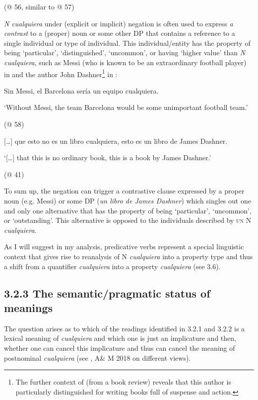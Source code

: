   (@ 56, similar to @ 57)

\textit{N cualquiera} under (explicit or implicit) negation is often used to express \textit{a contrast}\textbf{ }to a (proper) noun or some other DP that contains a reference to a single individual or type of individual. This individual/entity has the property of being ‘particular’, ‘distinguished’, ‘uncommon’, or having ‘higher value’ than \textit{N cualquiera}, such as Messi (who is known to be an extraordinary football player) in  and the author John Dashner\footnote{The further context of  (from a book review) reveals that this author is particularly distinguished for writing books full of suspense and action.} in :

\label{bkm:Ref66615171}  Sin Messi, el Barcelona sería un equipo cualquiera.

  ‘Without Messi, the team Barcelona would be some unimportant football team.’

  (@ 58)

\label{bkm:Ref150779604}  […] que esto no es un libro cualquiera, esto es un libro de James Dashner.

  ‘[…] that this is no ordinary book, this is a book by James Dashner.’

  (@ 41)

To sum up, the negation can trigger a contrastive clause expressed by a proper noun (e.g. Messi) or some DP (\textit{un libro de James Dashner}) which singles out one and only one alternative that has the property of being ‘particular’, ‘uncommon’, or ‘outstanding’. This alternative is opposed to the individuals described by \textsc{un} N \textit{cualquiera}.

  As I will suggest in my analysis, predicative verbs represent a special linguistic context that gives rise to reanalysis of N \textit{cualquiera} into a property type and thus a shift from a quantifier \textit{cualquiera} into a property \textit{cualquiera} (see 3.6). 

\subsection{\textbf{3.2.3} \textbf{The} \textbf{semantic/pragmatic} \textbf{status} \textbf{of} \textbf{meanings}}

The question arises as to which of the readings identified in 3.2.1 and 3.2.2 is a lexical meaning of \textit{cualquiera} and which one is just an implicature and then, whether one can cancel this implicature and thus can cancel the meaning of postnominal \textit{cualquiera} (see \citealt{Aloni2021}, A\& M 2018 on different views).

